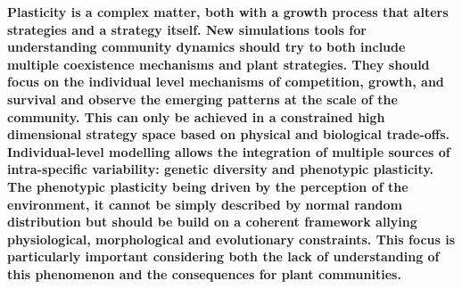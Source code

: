 \textbf{Plasticity is a complex matter, both with a growth process that alters strategies and a strategy itself. New simulations tools for understanding community dynamics should try to both include multiple coexistence mechanisms and plant strategies. They should focus on the individual level mechanisms of competition, growth, and survival and observe the emerging patterns at the scale of the community. This can only be achieved in a constrained high dimensional strategy space based on physical and biological trade-offs. Individual-level modelling allows the integration of multiple sources of intra-specific variability: genetic diversity and phenotypic plasticity. The phenotypic plasticity being driven by the perception of the environment, it cannot be simply described by normal random distribution but should be build on a coherent framework allying physiological, morphological and evolutionary constraints. This focus is particularly important considering both the lack of understanding of this phenomenon and the consequences for plant communities.  }


